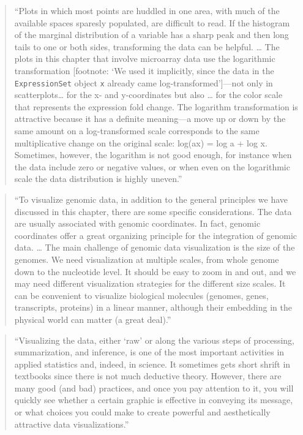 \documentclass[]{tufte-book}
\begin{document}
\begin{quote}
``Plots in which most points are huddled in one area, with much of the available
spaces sparesly populated, are difficult to read. If the histogram of the
marginal distribution of a variable has a sharp peak and then long tails to
one or both sides, transforming the data can be helpful. \ldots{} The plots in
this chapter that involve microarray data use the logarithmic transformation
{[}footnote: `We used it implicitly, since the data in the \texttt{ExpressionSet} object
\texttt{x} already came log-transformed'{]}---not only in scatterplots\ldots{} for the x- and
y-coordinates but also \ldots{} for the color scale that represents the
expression fold change. The logarithm transformation is attractive because it has
a definite meaning---a move up or down by the same amount on a log-transformed
scale corresponds to the same multiplicative change on the original scale:
log(ax) = log a + log x. Sometimes, however, the logarithm is not good enough,
for instance when the data include zero or negative values, or when even on the
logarithmic scale the data distribution is highly uneven.'' \citep{holmes2018modern}
\end{quote}

\begin{quote}
``To visualize genomic data, in addition to the general principles we have
discussed in this chapter, there are some specific considerations. The data are
usually associated with genomic coordinates. In fact, genomic coordinates offer
a great organizing principle for the integration of genomic data. \ldots{} The main
challenge of genomic data visualization is the size of the genomes. We need
visualization at multiple scales, from whole genome down to the
nucleotide level. It should be easy to zoom in and out, and we may need different
visualization strategies for the different size scales. It can be convenient to
visualize biological molecules (genomes, genes, transcripts, proteins) in a linear
manner, although their embedding in the physical world can matter (a great deal).''
\citep{holmes2018modern}
\end{quote}

\begin{quote}
``Visualizing the data, either `raw' or along the various steps of processing,
summarization, and inference, is one of the most important activities in applied
statistics and, indeed, in science. It sometimes gets short shrift in textbooks
since there is not much deductive theory. However, there are many good (and bad)
practices, and once you pay attention to it, you will quickly see whether a
certain graphic is effective in conveying its message, or what
choices you could make to create powerful and aesthetically attractive data
visualizations.'' \citep{holmes2018modern}
\end{quote}
\end{document}
